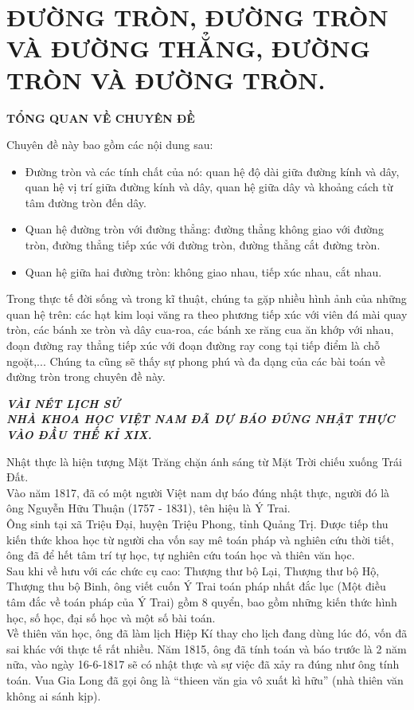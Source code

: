 
\section{ĐƯỜNG TRÒN, ĐƯỜNG TRÒN VÀ ĐƯỜNG THẲNG, ĐƯỜNG TRÒN VÀ ĐƯỜNG TRÒN.}
\begin{center}
 \large \textbf{TỔNG QUAN VỀ CHUYÊN ĐỀ}
\end{center}
Chuyên đề này bao gồm các nội dung sau:
\begin{itemize}
	\item Đường tròn và các tính chất của nó: quan hệ độ dài giữa đường kính và dây, quan hệ vị trí giữa đường kính và dây, quan hệ giữa dây và khoảng cách từ tâm đường tròn đến dây.
	\item Quan hệ đường tròn với đường thẳng: đường thẳng không giao với đường tròn, đường thẳng tiếp xúc với đường tròn, đường thẳng cắt đường tròn.
	\item Quan hệ giữa hai đường tròn: không giao nhau, tiếp xúc nhau, cắt nhau.
\end{itemize}
Trong thực tế đời sống và trong kĩ thuật, chúng ta gặp nhiều hình ảnh của những quan hệ trên: các hạt kim loại văng ra theo phương tiếp xúc với viên đá mài quay tròn, các bánh xe tròn và dây cua-roa, các bánh xe răng cua ăn khớp với nhau, đoạn đường ray thẳng tiếp xúc với đoạn đường ray cong tại tiếp điểm là chỗ ngoặt,...
Chúng ta cũng sẽ thấy sự phong phú và đa dạng của các bài toán về đường tròn trong chuyên đề này.
\begin{center}
	\textbf{\textit{VÀI NÉT LỊCH SỬ}}\\
	\textbf{\textit{NHÀ KHOA HỌC VIỆT NAM ĐÃ DỰ BÁO ĐÚNG NHẬT THỰC VÀO ĐẦU THẾ KỈ XIX.}}
\end{center}
Nhật thực là hiện tượng Mặt Trăng chặn ánh sáng từ Mặt Trời chiếu xuống Trái Đất.\\
Vào năm 1817, đã có một người Việt nam dự báo đúng nhật thực, người đó là ông Nguyễn Hữu Thuận (1757 - 1831), tên hiệu là Ý Trai.\\
Ông sinh tại xã Triệu Đại, huyện Triệu Phong, tỉnh Quảng Trị. Được tiếp thu kiến thức khoa học từ người cha vốn say mê toán pháp và nghiên cứu thời tiết, ông đã để hết tâm trí tự học, tự nghiên cứu toán học và thiên văn học.\\
Sau khi về hưu với các chức cụ cao: Thượng thư bộ Lại, Thượng thư bộ Hộ, Thượng thu bộ Binh, ông viết cuốn Ý Trai toán pháp nhất đắc lục (Một điều tâm đắc về toán pháp của Ý Trai) gồm 8 quyển, bao gồm những kiến thức hình học, số học, đại số học và một số bài toán.\\
Về thiên văn học, ông đã làm lịch Hiệp Kí thay cho lịch đang dùng lúc đó, vốn đã sai khác với thực tế rất nhiều. Năm 1815, ông đã tính toán và báo trước là 2 năm nữa, vào ngày 16-6-1817 sẽ có nhật thực và sự việc đã xảy ra đúng như ông tính toán. Vua Gia Long đã gọi ông là ``thieen văn gia vô xuất kì hữu'' (nhà thiên văn không ai sánh kịp).
